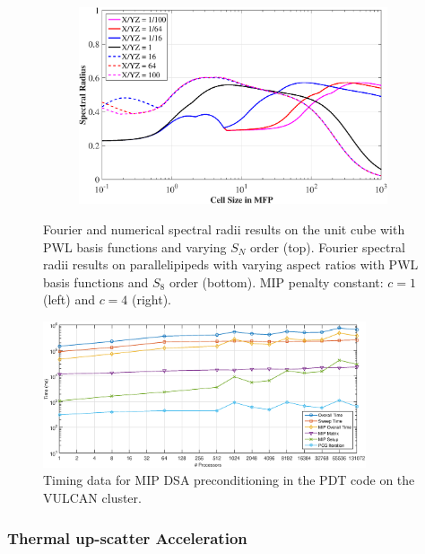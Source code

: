 \documentclass[11pt]{article}
\begin{document}
\begin{figure}[hbt]
\begin{subfigure}[b]{0.48\textwidth}
	\end{subfigure}
	\hfill
	\begin{subfigure}[b]{0.48\textwidth}
		\centering
		\includegraphics[width=\textwidth]{figures/SI_MIP_hex_LS8_C=4_AR.eps}
	\end{subfigure}
\caption{Fourier and numerical spectral radii results on the unit cube with PWL basis functions and varying $S_N$ order (top). Fourier spectral radii results on parallelipipeds with varying aspect ratios with PWL basis functions and $S_8$ order (bottom). MIP penalty constant: $c=1$ (left) and $c=4$ (right).}
\label{fig::fourier_NSR}
\end{figure}



\begin{figure}[hbt]
\centering
\includegraphics[width=0.85\textwidth]{figures/Vulcan_DSA_Timing.eps}
\caption{Timing data for MIP DSA preconditioning in the PDT code on the VULCAN cluster.}
\label{fig::Vulcan_MIP_Timing}
\end{figure}

\subsubsection{Thermal up-scatter Acceleration}
\label{sec::CW_DSA_Upscatter}
\end{document}
